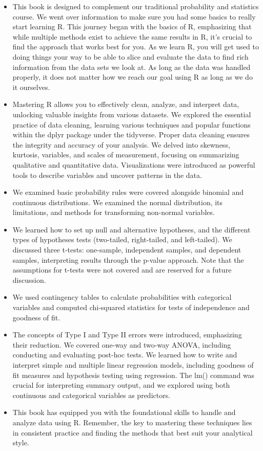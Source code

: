 \documentclass[
  letterpaper,
  DIV=11,
  numbers=noendperiod]{scrreprt}
\providecommand{\tightlist}{%
  \setlength{\itemsep}{0pt}\setlength{\parskip}{0pt}}\usepackage{longtable,booktabs,array}
\begin{document}
\begin{itemize}
\tightlist
\item
  This book is designed to complement our traditional probability and
  statistics course. We went over information to make sure you had some
  basics to really start learning R. This journey began with the basics
  of R, emphasizing that while multiple methods exist to achieve the
  same results in R, it's crucial to find the approach that works best
  for you. As we learn R, you will get used to doing things your way to
  be able to slice and evaluate the data to find rich information from
  the data sets we look at. As long as the data was handled properly, it
  does not matter how we reach our goal using R as long as we do it
  ourselves.
\item
  Mastering R allows you to effectively clean, analyze, and interpret
  data, unlocking valuable insights from various datasets. We explored
  the essential practice of data cleaning, learning various techniques
  and popular functions within the dplyr package under the tidyverse.
  Proper data cleaning ensures the integrity and accuracy of your
  analysis. We delved into skewness, kurtosis, variables, and scales of
  measurement, focusing on summarizing qualitative and quantitative
  data. Visualizations were introduced as powerful tools to describe
  variables and uncover patterns in the data.
\item
  We examined basic probability rules were covered alongside binomial
  and continuous distributions. We examined the normal distribution, its
  limitations, and methods for transforming non-normal variables.
\item
  We learned how to set up null and alternative hypotheses, and the
  different types of hypotheses tests (two-tailed, right-tailed, and
  left-tailed). We discussed three t-tests: one-sample, independent
  samples, and dependent samples, interpreting results through the
  p-value approach. Note that the assumptions for t-tests were not
  covered and are reserved for a future discussion.
\item
  We used contingency tables to calculate probabilities with categorical
  variables and computed chi-squared statistics for tests of
  independence and goodness of fit.
\item
  The concepts of Type I and Type II errors were introduced, emphasizing
  their reduction. We covered one-way and two-way ANOVA, including
  conducting and evaluating post-hoc tests. We learned how to write and
  interpret simple and multiple linear regression models, including
  goodness of fit measures and hypothesis testing using regression. The
  lm() command was crucial for interpreting summary output, and we
  explored using both continuous and categorical variables as
  predictors.
\item
  This book has equipped you with the foundational skills to handle and
  analyze data using R. Remember, the key to mastering these techniques
  lies in consistent practice and finding the methods that best suit
  your analytical style.
\end{itemize}
\end{document}
